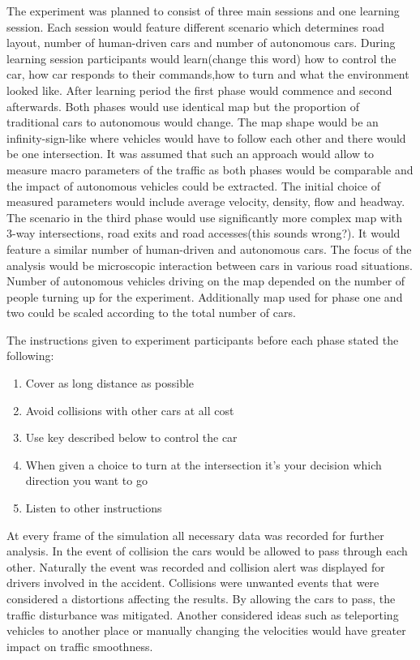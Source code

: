 \documentclass[11pt,english]{article}
\begin{document}
The experiment was planned to consist of three main sessions and one learning session. Each session would feature different scenario which determines road layout, number of human-driven cars and number of autonomous cars. During learning session participants would learn(change this word) how to control the car, how car responds to their commands,how to turn and what the environment looked like. 
After learning period the first phase would commence and second afterwards. Both phases would use identical map but the proportion of traditional cars to autonomous would change. The map shape would be an infinity-sign-like where vehicles would have to follow each other and there would be one intersection. It was assumed that such an approach would allow to measure macro parameters of the traffic as both phases would be comparable and the impact of autonomous vehicles could be extracted. The initial choice of measured parameters would include average velocity, density, flow and headway. 
The scenario in the third phase would use significantly more complex map with 3-way  intersections, road exits and road accesses(this sounds wrong?). It would feature a similar number of human-driven and autonomous cars. The focus of the analysis would be microscopic interaction between cars in various road situations. 
Number of autonomous vehicles driving on the map depended on the number of people turning up for the experiment. Additionally map used for phase one and two could be scaled according to the total number of cars.




The instructions given to experiment participants before each phase stated the following:

\begin{enumerate}
  \item Cover as long distance as possible
  \item Avoid collisions with other cars at all cost
  \item Use key described below to control the car
  \item When given a choice to turn at the intersection it's your decision which direction you want to go
  \item Listen to other instructions
\end{enumerate}


At every frame of the simulation  all necessary data was recorded for further analysis. In the event of collision the cars would be allowed to pass through each other. Naturally the event was recorded and collision alert was displayed for drivers involved in the accident. Collisions were unwanted events that were considered a distortions affecting the results. By allowing the cars to pass, the traffic disturbance was mitigated. Another considered ideas such as teleporting vehicles to another place or manually changing the velocities would have greater impact on traffic smoothness. 
\end{document}
